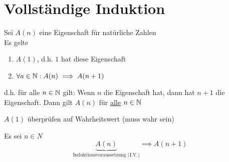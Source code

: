 \documentclass{myclass}
\begin{document}
\section{Vollständige Induktion}

\begin{theorem}
	\label{theo:Induktion}
	Sei $ A(n) $ eine Eigenschaft für natürliche Zahlen\\
	Es gelte
	\begin{enumerate}[label=(\roman*)]
		\item $ A(1) $, d.h. $ 1 $ hat diese Eigenschaft
		\item $ \forall a \in \mathbb{N} : A(n) \implies A(n+1) $
	\end{enumerate}
	d.h. für alle $ n \in \mathbb{N} $ gilt: Wenn $ n $ die Eigenschaft hat, dann hat $ n + 1 $ die Eigenschaft.
	Dann gilt $ A(n) $ für \underline{alle} $ n \in \mathbb{N} $
	\begin{blackbox}[Induktionsanfang (I.A.)]
		$ A(1) $ überprüfen auf Wahrheitswert (muss wahr sein)
	\end{blackbox}
	\begin{blackbox}[Induktionsschritt (I.S.)]
		Es sei $ n \in N $
		\[ \underbrace{A(n)}_{\text{Induktionsvoraussetzung (I.V.)}} \implies A(n+1) \]
	\end{blackbox}
\end{theorem}
\end{document}
